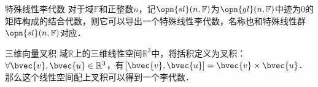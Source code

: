 \begin{example}{特殊线性李代数}
对于域$\mathbb{F}$和正整数$n$，记$\opn{sl}(n, \mathbb{F})$为$\opn{gl}(n, \mathbb{F})$中迹为$0$的矩阵构成的结合代数，则它可以导出一个特殊线性李代数，名称也和特殊线性群$\opn{sl}(n, \mathbb{F})$对应．
\end{example}

\begin{example}{三维向量叉积}
域$\mathbb{R}$上的三维线性空间$\mathbb{R}^3$中，将括积定义为叉积：$\forall \bvec{v}, \bvec{u}\in \mathbb{R}^3$，有$[\bvec{v}, \bvec{u}]=\bvec{v}\times\bvec{u}$．那么这个线性空间配上叉积可以得到一个李代数．
\end{example}




